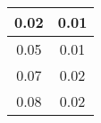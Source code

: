 \begin{tabular}{|c|c|}
\hline
0.02&0.01\\\hline
0.05&0.01\\\hline
0.07&0.02\\\hline
0.08&0.02\\\hline
\end{tabular}
